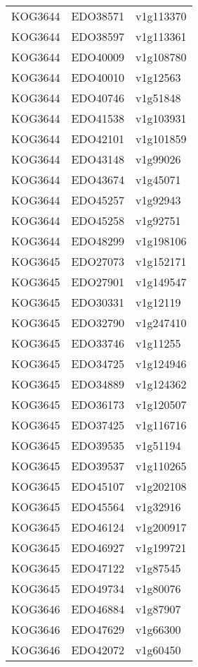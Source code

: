 \begin{longtable}[l]{lll}
\rowcolor{gray!6}  KOG3644 & EDO38571 & v1g113370\\
KOG3644 & EDO38597 & v1g113361\\
\rowcolor{gray!6}  KOG3644 & EDO40009 & v1g108780\\
KOG3644 & EDO40010 & v1g12563\\
\rowcolor{gray!6}  KOG3644 & EDO40746 & v1g51848\\
KOG3644 & EDO41538 & v1g103931\\
\rowcolor{gray!6}  KOG3644 & EDO42101 & v1g101859\\
KOG3644 & EDO43148 & v1g99026\\
\rowcolor{gray!6}  KOG3644 & EDO43674 & v1g45071\\
KOG3644 & EDO45257 & v1g92943\\
\rowcolor{gray!6}  KOG3644 & EDO45258 & v1g92751\\
KOG3644 & EDO48299 & v1g198106\\
\rowcolor{gray!6}  KOG3645 & EDO27073 & v1g152171\\
KOG3645 & EDO27901 & v1g149547\\
\rowcolor{gray!6}  KOG3645 & EDO30331 & v1g12119\\
KOG3645 & EDO32790 & v1g247410\\
\rowcolor{gray!6}  KOG3645 & EDO33746 & v1g11255\\
KOG3645 & EDO34725 & v1g124946\\
\rowcolor{gray!6}  KOG3645 & EDO34889 & v1g124362\\
KOG3645 & EDO36173 & v1g120507\\
\rowcolor{gray!6}  KOG3645 & EDO37425 & v1g116716\\
KOG3645 & EDO39535 & v1g51194\\
\rowcolor{gray!6}  KOG3645 & EDO39537 & v1g110265\\
KOG3645 & EDO45107 & v1g202108\\
\rowcolor{gray!6}  KOG3645 & EDO45564 & v1g32916\\
KOG3645 & EDO46124 & v1g200917\\
\rowcolor{gray!6}  KOG3645 & EDO46927 & v1g199721\\
KOG3645 & EDO47122 & v1g87545\\
\rowcolor{gray!6}  KOG3645 & EDO49734 & v1g80076\\
KOG3646 & EDO46884 & v1g87907\\
\rowcolor{gray!6}  KOG3646 & EDO47629 & v1g66300\\
KOG3646 & EDO42072 & v1g60450\\

\end{longtable}
